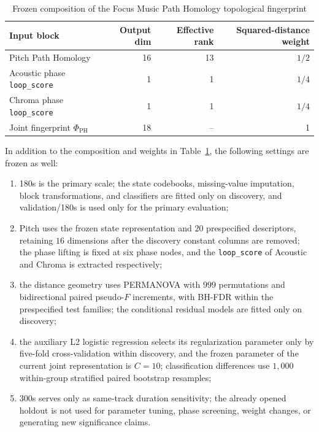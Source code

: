 \documentclass{article}
\begin{document}
\begin{table}[htbp]
\centering
\caption{Frozen composition of the Focus Music Path Homology topological fingerprint}
\label{tab:frozen_fingerprint}
\renewcommand{\arraystretch}{1.5}
\setlength{\tabcolsep}{8pt}
\begin{tabular}{lrrr}
\toprule
Input block & Output dim & Effective rank & Squared-distance weight \\
\midrule
Pitch Path Homology & 16 & 13 & $1/2$ \\
Acoustic phase \texttt{loop\_score} & 1 & 1 & $1/4$ \\
Chroma phase \texttt{loop\_score} & 1 & 1 & $1/4$ \\
\midrule
Joint fingerprint $\Phi_{\mathrm{PH}}$ & 18 & -- & 1 \\
\bottomrule
\end{tabular}
\end{table}

In addition to the composition and weights in Table~\ref{tab:frozen_fingerprint}, the following settings are frozen as well:
\begin{enumerate}
  \item 180s is the primary scale; the state codebooks, missing-value imputation, block transformations, and classifiers are fitted only on
  discovery, and validation/180s is used only for the primary evaluation;
  \item Pitch uses the frozen state representation and $20$ prespecified descriptors, retaining $16$ dimensions after the discovery
  constant columns are removed; the phase lifting is fixed at six phase nodes, and the \texttt{loop\_score} of Acoustic and
  Chroma is extracted respectively;
  \item the distance geometry uses PERMANOVA with $999$ permutations and bidirectional paired pseudo-$F$ increments,
  with BH-FDR within the prespecified test families; the conditional residual models are fitted only on discovery;
  \item the auxiliary L2 logistic regression selects its regularization parameter only by five-fold cross-validation within discovery, and the
  frozen parameter of the current joint representation is $C=10$; classification differences use $1{,}000$ within-group stratified paired bootstrap resamples;
  \item 300s serves only as same-track duration sensitivity; the already opened holdout is not used for parameter tuning, phase screening,
  weight changes, or generating new significance claims.
\end{enumerate}
\end{document}
